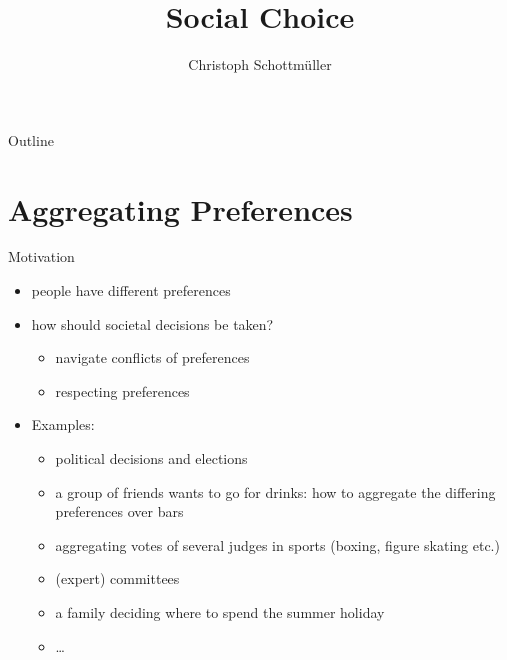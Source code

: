 \documentclass[bigger]{beamer}
\author{Christoph Schottmüller}
\date{}
\title{Social Choice}
\begin{document}
\maketitle
\begin{frame}{Outline}
\tableofcontents
\end{frame}


\section{Aggregating Preferences}
\label{sec:org3cfc89a}
\begin{frame}[label={sec:org78dc6ae}]{Motivation}
\begin{itemize}
\item people have different preferences
\item how should societal decisions be taken?
\begin{itemize}
\item navigate conflicts of preferences
\item respecting preferences
\end{itemize}
\item Examples:
\begin{itemize}
\item political decisions and elections
\item a group of friends wants to go for drinks: how to aggregate the differing preferences over bars
\item aggregating votes of several judges in sports (boxing, figure skating etc.)
\item (expert) committees
\item a family deciding where to spend the summer holiday
\item \ldots{}
\end{itemize}
\end{itemize}
\end{frame}
\end{document}
